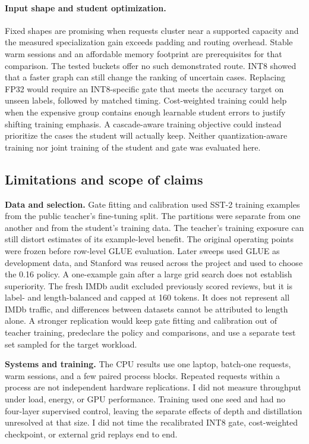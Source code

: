 \paragraph{Input shape and student optimization.}
Fixed shapes are promising when requests cluster near a supported capacity and the measured specialization gain exceeds padding and routing overhead. Stable warm sessions and an affordable memory footprint are prerequisites for that comparison. The tested buckets offer no such demonstrated route. INT8 showed that a faster graph can still change the ranking of uncertain cases. Replacing FP32 would require an INT8-specific gate that meets the accuracy target on unseen labels, followed by matched timing. Cost-weighted training could help when the expensive group contains enough learnable student errors to justify shifting training emphasis. A cascade-aware training objective could instead prioritize the cases the student will actually keep. Neither quantization-aware training nor joint training of the student and gate was evaluated here.

\subsection{Limitations and scope of claims}
\textbf{Data and selection.} Gate fitting and calibration used SST-2 training examples from the public teacher's fine-tuning split. The partitions were separate from one another and from the student's training data. The teacher's training exposure can still distort estimates of its example-level benefit. The original operating points were frozen before row-level GLUE evaluation. Later sweeps used GLUE as development data, and Stanford was reused across the project and used to choose the 0.16 policy. A one-example gain after a large grid search does not establish superiority. The fresh IMDb audit excluded previously scored reviews, but it is label- and length-balanced and capped at 160 tokens. It does not represent all IMDb traffic, and differences between datasets cannot be attributed to length alone. A stronger replication would keep gate fitting and calibration out of teacher training, predeclare the policy and comparisons, and use a separate test set sampled for the target workload.

\textbf{Systems and training.} The CPU results use one laptop, batch-one requests, warm sessions, and a few paired process blocks. Repeated requests within a process are not independent hardware replications. I did not measure throughput under load, energy, or GPU performance. Training used one seed and had no four-layer supervised control, leaving the separate effects of depth and distillation unresolved at that size. I did not time the recalibrated INT8 gate, cost-weighted checkpoint, or external grid replays end to end.

